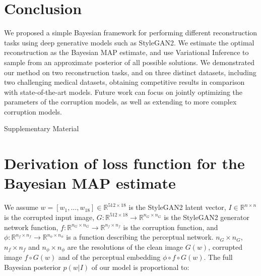 \documentclass{article}
\newcommand{\mc}[1]{\mathbb{#1}}
\newcommand{\ci}[1]{\circ{#1}}
\begin{document}
\section{Conclusion}

We proposed a simple Bayesian framework for performing different reconstruction tasks using deep generative models such as StyleGAN2. We estimate the optimal reconstruction as the Bayesian MAP estimate, and use Variational Inference to sample from an approximate posterior of all possible solutions. We demonstrated our method on two reconstruction tasks, and on three distinct datasets, including two challenging medical datasets, obtaining competitive results in comparison with state-of-the-art models. Future work can focus on jointly optimizing the parameters of the corruption models, as well as extending to more complex corruption models.





{
\small





}








\pagebreak

\appendix

\begin{center}
\Large{Supplementary Material} 
\end{center}



\section{Derivation of loss function for the Bayesian MAP estimate}
\label{supderiv}


We assume $w = [w_1, \dots, w_{18}] \in \mc{R}^{512 \times 18}$ is the StyleGAN2 latent vector, $I \in \mc{R}^{n \times n}$ is the corrupted input image, $G : \mc{R}^{512 \times 18} \to \mc{R}^{n_G \times n_G}$ is the StyleGAN2 generator network function, $f : \mc{R}^{n_G \times n_G} \to \mc{R}^{n_f \times n_f}$ is the corruption function, and $\phi : \mc{R}^{n_f \times n_f} \to  \mc{R}^{n_\phi \times n_\phi}$ is a function describing the perceptual network. ${n_G \times n_G}$, ${n_f \times n_f}$ and ${n_\phi \times n_\phi}$ are the resolutions of the clean image $G(w)$, corrupted image $f \ci G(w)$ and of the perceptual embedding $\phi \ci f \ci G(w)$. The full Bayesian posterior $p(w|I)$ of our model is proportional to:
\end{document}
